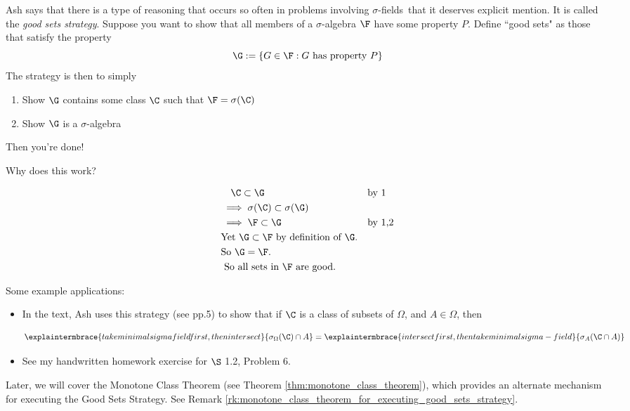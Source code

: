 \documentclass{article} %
\newcommand{\sfs}{$\sigma$-fields}
\begin{document}
Ash says that there is a type of reasoning that occurs so often in problems involving \sfs\ that it deserves explicit mention.  It is called the \textit{good sets strategy}.   Suppose you want to show that all members of a $\sigma$-algebra   $\F$ have some property $P$.  Define ``good sets" as those that satisfy the property
\[ \G := \{ G \in \F : G \text{ has property } P \} \]
The strategy is then to simply
\begin{enumerate}
\item Show $\G$ contains some class $\C$ such that $\F = \sigma(\C)$
\item Show $\G$ is a $\sigma$-algebra 	
\end{enumerate}


Then you're done!  

Why does this work?

\begin{align*}
& \quad \C \subset \G &&	\text{by 1}\\
&\implies \sigma(\C) \subset \sigma(\G) &&  \\
&\implies \F \subset \G && \text{by 1,2} \\
& \text{Yet $\G \subset \F$ by definition of $\G$.} && \\
& \text{So $\G = \F$.} && \\
& \text{ So all sets in $\F$ are good.} && \\
\end{align*}

Some example applications:
 \begin{itemize}
 \item In the text, Ash uses this strategy (see pp.5) to show that if $\C$ is a class of subsets of $\Omega$, and $A \in \Omega$, then

\[ \explaintermbrace{take minimal sigma field first, then intersect}{\sigma_\Omega(\C) \cap A} = \explaintermbrace{intersect first, then take minimal sigma-field}{\sigma_A(\C \cap A)} \]
 \item  See my handwritten homework exercise for  $\S$ 1.2, Problem 6.
 \end{itemize}

\begin{remark} 
Later, we will cover the Monotone Class Theorem (see Theorem \ref{thm:monotone_class_theorem}), which provides an alternate mechanism for executing the Good Sets Strategy.  See Remark \ref{rk:monotone_class_theorem_for_executing_good_sets_strategy}.
\end{remark}
\end{document}
